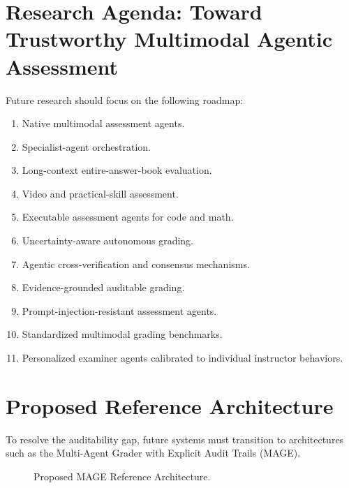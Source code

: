 \documentclass[11pt,a4paper]{article}
\begin{document}
\section{Research Agenda: Toward Trustworthy Multimodal Agentic Assessment}

Future research should focus on the following roadmap:
\begin{enumerate}
    \item Native multimodal assessment agents.
    \item Specialist-agent orchestration.
    \item Long-context entire-answer-book evaluation.
    \item Video and practical-skill assessment.
    \item Executable assessment agents for code and math.
    \item Uncertainty-aware autonomous grading.
    \item Agentic cross-verification and consensus mechanisms.
    \item Evidence-grounded auditable grading.
    \item Prompt-injection-resistant assessment agents.
    \item Standardized multimodal grading benchmarks.
    \item Personalized examiner agents calibrated to individual instructor behaviors.
\end{enumerate}

\section{Proposed Reference Architecture}

To resolve the auditability gap, future systems must transition to architectures such as the Multi-Agent Grader with Explicit Audit Trails (MAGE).

\begin{figure}[H]
\centering
{}
\caption{Proposed MAGE Reference Architecture.}
\label{fig:mage}
\end{figure}
\end{document}
